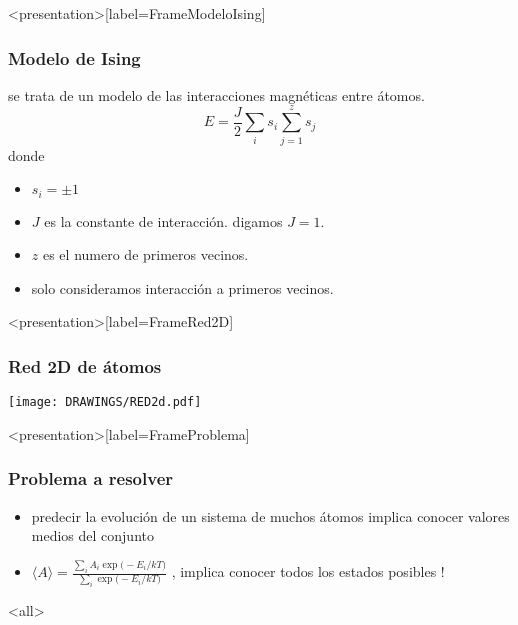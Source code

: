\mode*

\begin{frame}<presentation>[label=FrameModeloIsing]
  \frametitle{Modelo de Ising}

  se trata de un modelo de las interacciones magnéticas entre átomos. 
    $$ E = \frac{J}{2}  \sum _i s_i \sum _{j=1} ^z  s_j $$
  donde 
  \begin{itemize}
     \item $s_i =  \pm 1$
     \item $J$ es la constante de interacción. digamos $J=1$.
     \item $z$ es el numero de primeros vecinos. 
     \item solo consideramos interacción a primeros vecinos.
  \end{itemize}
\end{frame}

\begin{frame}<presentation>[label=FrameRed2D]
  \frametitle{Red 2D de átomos}
  \centering \texttt{[image: DRAWINGS/RED2d.pdf]}
\end{frame}

\begin{frame}<presentation>[label=FrameProblema]
  \frametitle{Problema a resolver}
  \begin{itemize}
      \item<+-> predecir la evolución de un sistema de muchos átomos implica conocer valores medios del
	conjunto
      \item<+-> $ \displaystyle \langle A \rangle =
	  \frac{ \displaystyle \sum _i A_i \exp\bigl(-E_i /kT\bigr) }
	  {\displaystyle \sum_i \exp \bigl( -E_i / kT \bigr) } $
	  , implica conocer todos los estados posibles !
  \end{itemize}

\end{frame}

\mode<all>
